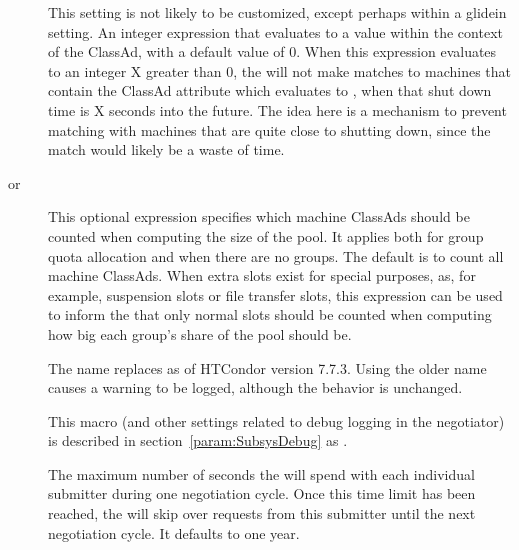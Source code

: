 \begin{description}
\label{param:NegotiatorTrimShutdownThreshold}
\item[\Macro{NEGOTIATOR\_TRIM\_SHUTDOWN\_THRESHOLD}] 
  This setting is not likely to be customized, except perhaps within 
  a glidein setting.  
  An integer expression that evaluates to a value within the context of
  the  ClassAd, 
  with a default value of 0.  
  When this expression evaluates to an integer X greater than 0, 
  the  will not make matches to machines 
  that contain the ClassAd attribute 
  which evaluates to ,
  when that shut down time is X seconds into the future.
  The idea here is a mechanism to prevent
  matching with machines that are quite close to shutting down, 
  since the match would likely be a waste of time.

\label{param:NegotiatorSlotPoolsizeConstraint}
\label{param:GroupDynamicMachConstraint}
\item[\Macro{NEGOTIATOR\_SLOT\_POOLSIZE\_CONSTRAINT} or
  \Macro{GROUP\_DYNAMIC\_MACH\_CONSTRAINT}]
  This optional expression specifies which machine ClassAds should be counted
  when computing the size of the pool.
  It applies both for group quota allocation and when there are no groups.
  The default is to count all machine ClassAds.
  When extra slots exist for special purposes,
  as, for example, suspension slots or file transfer slots,
  this expression can be used to inform the  that 
  only normal slots should be counted when computing how big each group's 
  share of the pool should be.
 
  The name  replaces
   as of HTCondor version 7.7.3.
  Using the older name causes a warning to be logged, although the
  behavior is unchanged.

\label{param:NegotiatorDebug}
\item[\Macro{NEGOTIATOR\_DEBUG}]
  This macro (and other settings related to debug logging in the negotiator) is
  described in section~\ref{param:SubsysDebug} as .

\label{param:NegotiatorMaxTimePerSubmitter}
\item[\Macro{NEGOTIATOR\_MAX\_TIME\_PER\_SUBMITTER}]
  The maximum number of seconds
  the  will spend with each individual submitter during one
  negotiation cycle.  Once this time limit has been reached, the
   will skip
  over requests from this submitter until the next negotiation cycle.
  It defaults to one year.


\end{description}
